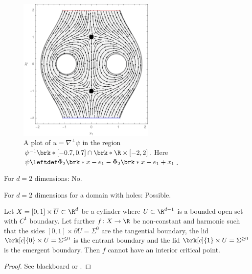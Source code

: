 \begin{frame}
 \begin{figure}
    \centering
    \includegraphics[width=0.6\textwidth]{../Plots/n2_hvf_InflowOutflow_symmetric_gray_2.pdf}
    \caption{A plot of $u=\nabla^\perp\psi$ in the region $\psi^{-1}\brk*{[-0.7,0.7]}\cap \brk*{\R\times[-2,2]}$.
    Here $\psi\leftdef\Phi_2\brk*{x-e_1}-\Phi_2\brk*{x+e_1}+x_1$.} 
    \label{pl:n2_hvf_InflowOutflow_symmetric_region}
  \end{figure} 
\end{frame}

\begin{frame}

  {\questionFlowthrough
  \begin{answer}
    \begin{itemize}
      \item For $d=2$ dimensions: No. 
        {\item For $d=2$ dimensions for a domain with holes: Possible.}
    \end{itemize}
  \end{answer}}
\end{frame}

\begin{frame}
  \begin{proposition}\label{pr:n3_inflowOutflowCylinder}
    Let $X=[0,1]\times \overline{U}\subset\R^d$ be a cylinder where $U\subset\R^{d-1}$ is a bounded open set with $C^1$ boundary.
    Let further $f\colon X\to\R$ be non-constant and
    harmonic such that the sides
    $[0,1]\times \partial U=\Sigma^0$ are the tangential boundary,
    the lid $\brk[c]{0}\times U=\Sigma^{\leq0}$ is the entrant boundary and
    the lid $\brk[c]{1}\times U=\Sigma^{\geq0}$ is the emergent boundary. 
    Then $f$ cannot have an interior critical point.
  \end{proposition}
  \begin{proof}
    See blackboard or \cite{Koppenhoefer2024}.
  \end{proof}
\end{frame}

